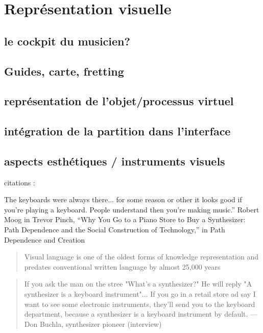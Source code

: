%
\chapter{Représentation visuelle}
\label{ch:visual_representation}



\section{le cockpit du musicien?}
\label{sec:visual_representation:sec1}

\section{Guides, carte, fretting}

\section{représentation de l'objet/processus virtuel}

\section{intégration de la partition dans l'interface}

\section{aspects esthétiques / instruments visuels}


citations :

The  keyboards  were  always  there...  for  some  reason  or  other  it  looks  good  if  you’re playing a keyboard. People understand then you’re making music.” Robert Moog in Trevor Pinch, “Why You Go to a Piano Store to Buy a Synthesizer: Path Dependence and the Social Construction of Technology,” in Path Dependence and Creation



\begin{quote}
Visual language is one of the oldest forms of knowledge representation and predates conventional written language by almost 25,000 years
\end{quote}
\cite{tufte_visual_2001}

\cite{moody_physics_2009}


\begin{quotation}
If you ask the man on the stree "What's a synthesizer?" He will reply "A synthesizer is a keyboard instrument"... If you go in a retail store ad say I want to see some electronic instruments, they'll send you to the keyboard department, because a synthesizer is a keyboard instrument by default. — Don Buchla, synthesizer pioneer (interview)
\end{quotation}
\cite{pinch_why_2001}